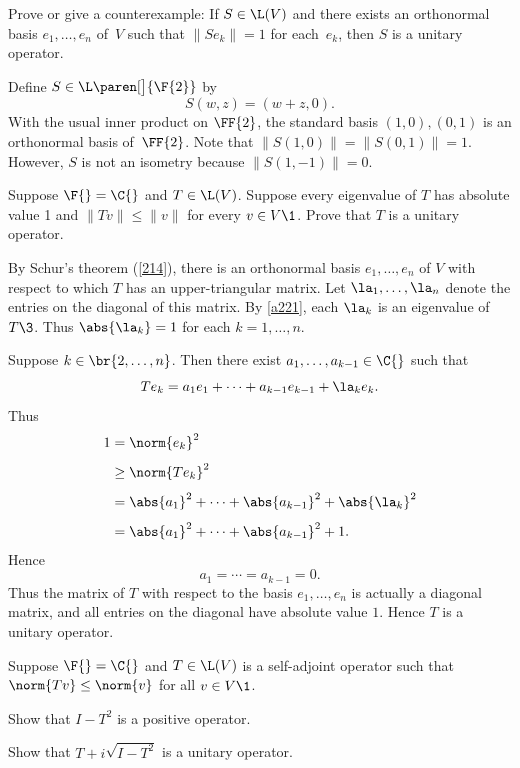 \exercise
Prove or give a counterexample: If $S \in \L(V)$ and there exists an orthonormal basis $e_1, \dots, e_n$ of~$V$ such that $\|Se_k\| = 1$ for each~$e_k$, then $S$ is a unitary operator.

\begin{Solution}
Define $S \in \L\paren[\big]{\F{2}}$ by
\[
S(w,z) = (w + z, 0).
\]
With the usual inner product on $\FF{2}$, the standard basis
$(1,0), (0,1)$ is an orthonormal basis of~$\FF{2}$.  Note that
$\|S(1,0)\| = \|S(0,1)\| = 1$.  However, $S$ is not an isometry because
$\|S(1,-1)\| = 0$.
\end{Solution}

\exercise
Suppose $\F{} = \C{}$ and $T \in \L(V)$. Suppose every eigenvalue of $T$ has absolute value 1 and
$\|Tv\| \le \|v\|$ for every $v \in V\1$. Prove that $T$ is a unitary operator.

\begin{Solution}
By Schur's theorem (\ref{214}), there is an orthonormal basis $e_1, \ldots, e_n$ of $V$ with respect to which $T$ has an upper-triangular matrix. Let $\la_1, \ldots, \la_n$ denote the entries on the diagonal of this matrix. By \ref{a221}, each $\la_k$ is an eigenvalue of $T\3$. Thus $\abs{\la_k} = 1$ for each $k = 1, \ldots, n$.

Suppose $k \in \br{2, \ldots, n}$. Then there exist $a_1, \ldots, a_{k-1} \in \C{}$ such that
\[
Te_k = a_1 e_1 + \cdots + a_{k-1} e_{k-1} + \la_k e_k.
\]
Thus
\begin{align*}
1 &= \norm{e_k}^2 \\[4bp]
&\ge \norm{Te_k}^2 \\[4bp]
&= \abs{a_1}^2 + \cdots + \abs{a_{k-1}}^2 + \abs{\la_k}^2 \\[4bp]
&= \abs{a_1}^2 + \cdots + \abs{a_{k-1}}^2 + 1.
\end{align*}
Hence
\[
a_1 = \cdots = a_{k-1} = 0.
\]
Thus the matrix of $T$ with respect to the basis $e_1, \ldots, e_n$ is actually a diagonal matrix, and all entries on the diagonal have absolute value $1$. Hence $T$ is a unitary operator.
\end{Solution}

\exercise
Suppose $\F{} = \C{}$ and $T \in \L(V)$ is a self-adjoint operator such that $\norm{Tv} \le \norm{v}$ for all $v \in V\1$.
\begin{subtheorem}
\item
Show that $I - T^2$ is a positive operator.
\item
Show that $T + i \sqrt{I - T^2}$ is a unitary operator.
\end{subtheorem}
\exercisesubtheoremend

